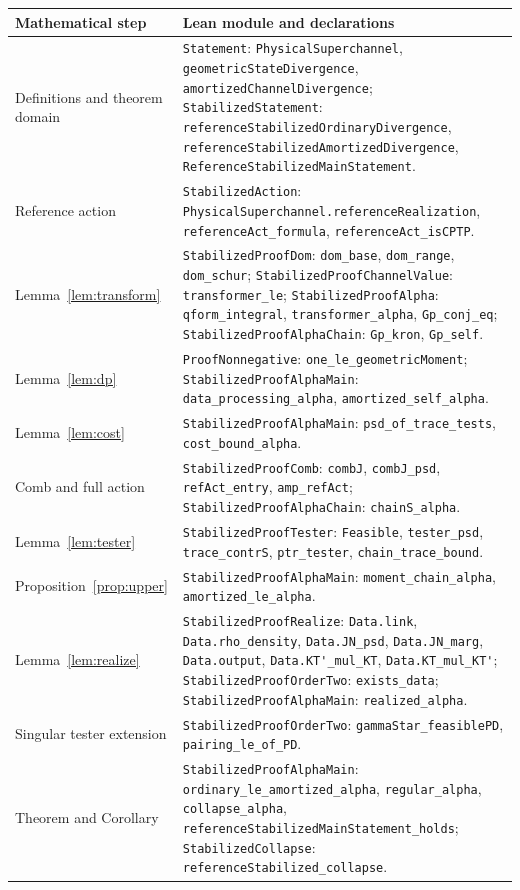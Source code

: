 \documentclass[11pt]{article}
\newcommand{\code}[1]{{\small\nolinkurl{#1}}}
\theoremstyle{remark}
\begin{document}
\small
\begin{longtable}{@{}p{}p{}@{}}
\toprule
Mathematical step & Lean module and declarations\\\midrule
\endhead
Definitions and theorem domain &
\code{Statement}: \code{PhysicalSuperchannel}, \code{geometricStateDivergence},
\code{amortizedChannelDivergence}; \code{StabilizedStatement}:
\code{referenceStabilizedOrdinaryDivergence},
\code{referenceStabilizedAmortizedDivergence},
\code{ReferenceStabilizedMainStatement}.\\
Reference action & \code{StabilizedAction}:
\code{PhysicalSuperchannel.referenceRealization},
\code{referenceAct_formula}, \code{referenceAct_isCPTP}.\\
Lemma~\ref{lem:transform} & \code{StabilizedProofDom}:
\code{dom_base}, \code{dom_range}, \code{dom_schur};
\code{StabilizedProofChannelValue}: \code{transformer_le};
\code{StabilizedProofAlpha}: \code{qform_integral},
\code{transformer_alpha}, \code{Gp_conj_eq};
\code{StabilizedProofAlphaChain}: \code{Gp_kron}, \code{Gp_self}.\\
Lemma~\ref{lem:dp} & \code{ProofNonnegative}: \code{one_le_geometricMoment};
\code{StabilizedProofAlphaMain}: \code{data_processing_alpha},
\code{amortized_self_alpha}.\\
Lemma~\ref{lem:cost} & \code{StabilizedProofAlphaMain}:
\code{psd_of_trace_tests}, \code{cost_bound_alpha}.\\
Comb and full action & \code{StabilizedProofComb}: \code{combJ},
\code{combJ_psd}, \code{refAct_entry}, \code{amp_refAct};
\code{StabilizedProofAlphaChain}: \code{chainS_alpha}.\\
Lemma~\ref{lem:tester} & \code{StabilizedProofTester}: \code{Feasible},
\code{tester_psd}, \code{trace_contrS}, \code{ptr_tester},
\code{chain_trace_bound}.\\
Proposition~\ref{prop:upper} & \code{StabilizedProofAlphaMain}:
\code{moment_chain_alpha}, \code{amortized_le_alpha}.\\
Lemma~\ref{lem:realize} & \code{StabilizedProofRealize}: \code{Data.link},
\code{Data.rho_density}, \code{Data.JN_psd}, \code{Data.JN_marg},
\code{Data.output}, \code{Data.KT'_mul_KT}, \code{Data.KT_mul_KT'};
\code{StabilizedProofOrderTwo}: \code{exists_data};
\code{StabilizedProofAlphaMain}: \code{realized_alpha}.\\
Singular tester extension & \code{StabilizedProofOrderTwo}:
\code{gammaStar_feasiblePD}, \code{pairing_le_of_PD}.\\
Theorem and Corollary & \code{StabilizedProofAlphaMain}:
\code{ordinary_le_amortized_alpha}, \code{regular_alpha},
\code{collapse_alpha}, \code{referenceStabilizedMainStatement_holds};
\code{StabilizedCollapse}: \code{referenceStabilized_collapse}.\\
\bottomrule
\end{longtable}
\normalsize
\end{document}
